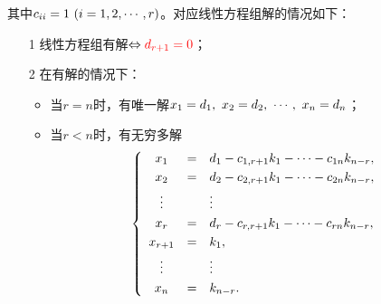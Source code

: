 其中$c_{ii}=1~(i=1,2,\cdots,r)$。对应线性方程组解的情况如下：   
\begin{itemize}
\item[1] 线性方程组有解$ \Leftrightarrow \textcolor{red}{d_{r+1}=0}$；\\[0.3cm]
\item[2] 在有解的情况下：
  \begin{itemize}
  \item 当$r=n$时，有唯一解$x_1=d_1,~x_2=d_2,~\cdots,~x_n=d_n$；
  \item 当$r<n$时，有无穷多解
    $$
    \left\{
    \begin{array}{ccl}
      x_1 &=& d_1 - c_{1,r+1}k_1 - \cdots - c_{1n}k_{n-r}, \\[0.1cm]
      x_2 &=& d_2 - c_{2,r+1}k_1 - \cdots - c_{2n}k_{n-r}, \\[0.1cm]
      \vdots & & \vdots \\[0.1cm]
      x_r &=& d_r - c_{r,r+1}k_1 - \cdots - c_{rn}k_{n-r}, \\[0.1cm]
      x_{r+1} &=& k_1, \\[0.1cm]
      \vdots && \vdots \\[0.1cm]
      x_{n} &=& k_{n-r}.
    \end{array}
    \right.
    $$
  \end{itemize}
\end{itemize}
